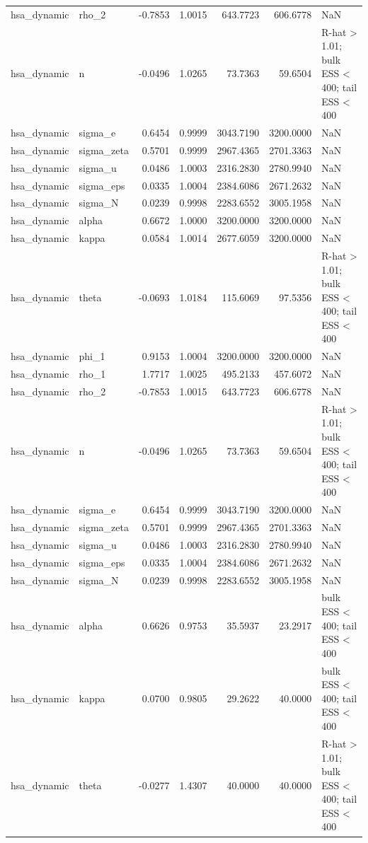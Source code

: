 \begin{tabular}{llrrrrl}
hsa\_dynamic & rho\_2 & -0.7853 & 1.0015 & 643.7723 & 606.6778 & NaN \\
hsa\_dynamic & n & -0.0496 & 1.0265 & 73.7363 & 59.6504 & R-hat > 1.01; bulk ESS < 400; tail ESS < 400 \\
hsa\_dynamic & sigma\_e & 0.6454 & 0.9999 & 3043.7190 & 3200.0000 & NaN \\
hsa\_dynamic & sigma\_zeta & 0.5701 & 0.9999 & 2967.4365 & 2701.3363 & NaN \\
hsa\_dynamic & sigma\_u & 0.0486 & 1.0003 & 2316.2830 & 2780.9940 & NaN \\
hsa\_dynamic & sigma\_eps & 0.0335 & 1.0004 & 2384.6086 & 2671.2632 & NaN \\
hsa\_dynamic & sigma\_N & 0.0239 & 0.9998 & 2283.6552 & 3005.1958 & NaN \\
hsa\_dynamic & alpha & 0.6672 & 1.0000 & 3200.0000 & 3200.0000 & NaN \\
hsa\_dynamic & kappa & 0.0584 & 1.0014 & 2677.6059 & 3200.0000 & NaN \\
hsa\_dynamic & theta & -0.0693 & 1.0184 & 115.6069 & 97.5356 & R-hat > 1.01; bulk ESS < 400; tail ESS < 400 \\
hsa\_dynamic & phi\_1 & 0.9153 & 1.0004 & 3200.0000 & 3200.0000 & NaN \\
hsa\_dynamic & rho\_1 & 1.7717 & 1.0025 & 495.2133 & 457.6072 & NaN \\
hsa\_dynamic & rho\_2 & -0.7853 & 1.0015 & 643.7723 & 606.6778 & NaN \\
hsa\_dynamic & n & -0.0496 & 1.0265 & 73.7363 & 59.6504 & R-hat > 1.01; bulk ESS < 400; tail ESS < 400 \\
hsa\_dynamic & sigma\_e & 0.6454 & 0.9999 & 3043.7190 & 3200.0000 & NaN \\
hsa\_dynamic & sigma\_zeta & 0.5701 & 0.9999 & 2967.4365 & 2701.3363 & NaN \\
hsa\_dynamic & sigma\_u & 0.0486 & 1.0003 & 2316.2830 & 2780.9940 & NaN \\
hsa\_dynamic & sigma\_eps & 0.0335 & 1.0004 & 2384.6086 & 2671.2632 & NaN \\
hsa\_dynamic & sigma\_N & 0.0239 & 0.9998 & 2283.6552 & 3005.1958 & NaN \\
hsa\_dynamic & alpha & 0.6626 & 0.9753 & 35.5937 & 23.2917 & bulk ESS < 400; tail ESS < 400 \\
hsa\_dynamic & kappa & 0.0700 & 0.9805 & 29.2622 & 40.0000 & bulk ESS < 400; tail ESS < 400 \\
hsa\_dynamic & theta & -0.0277 & 1.4307 & 40.0000 & 40.0000 & R-hat > 1.01; bulk ESS < 400; tail ESS < 400 \\

\end{tabular}
